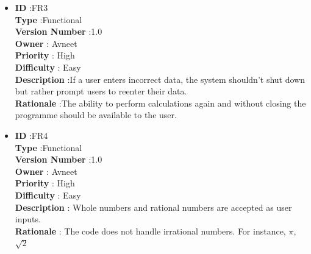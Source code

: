 \documentclass[a4paper,12pt]{report}
\begin{document}
\begin{itemize}
	\item
    \textbf{ID } \hspace{3cm} :FR3  \\
	\textbf{Type } \hspace{2.4cm}  :Functional\\
	\textbf{Version Number} \hspace{0.3cm} :1.0  \\
	\textbf{Owner } \hspace{1.98cm} : Avneet \\
	\textbf{Priority } \hspace{1.75cm} : High\\
	\textbf{Difficulty } \hspace{1.5cm} : Easy\\
	\textbf{Description }\hspace{1.2cm} :If a user enters incorrect data, the system shouldn't shut down but rather prompt users to reenter their data.\\
	\textbf{Rationale }\hspace{1.6cm} :The ability to perform calculations again and without closing the programme should be available to the user. \\

	\item
    \textbf{ID } \hspace{3cm} :FR4  \\
	\textbf{Type } \hspace{2.4cm}  :Functional\\
	\textbf{Version Number} \hspace{0.3cm} :1.0  \\
	\textbf{Owner } \hspace{1.98cm} : Avneet \\
	\textbf{Priority } \hspace{1.75cm} : High\\
	\textbf{Difficulty } \hspace{1.5cm} : Easy\\
	\textbf{Description }\hspace{1.2cm} : Whole numbers and rational numbers are accepted as user inputs.\\
	\textbf{Rationale }\hspace{1.6cm} : The code does not handle irrational numbers. For instance, $\pi$, $\sqrt{2}$ \\


\end{itemize}
\end{document}
